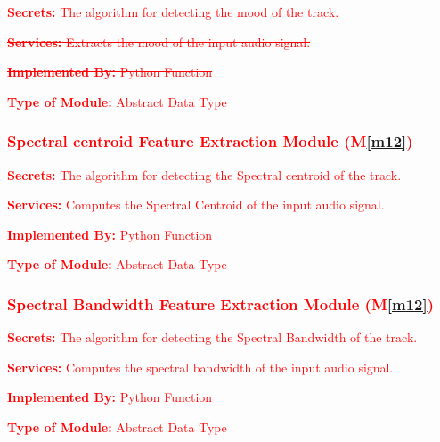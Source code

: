 \documentclass[12pt, titlepage]{article}
\newcommand{\mref}[1]{M\ref{#1}}
\begin{document}
\begin{description}
\item \textcolor{red}{\sout{\textbf{Secrets:} The algorithm for detecting the mood of the track.}}
\item \textcolor{red}{\sout{\textbf{Services:} Extracts the mood of the input audio signal.}}
\item \textcolor{red}{\sout{\textbf{Implemented By:} Python Function}}
\item \textcolor{red}{\sout{\textbf{Type of Module:} Abstract Data Type}}
\end{description}

\subsubsection{\textcolor{red}{Spectral centroid Feature Extraction Module (\mref{m12})}}

\begin{description}
\item \textcolor{red}{\textbf{Secrets:} The algorithm for detecting the Spectral centroid of the track.}
\item \textcolor{red}{\textbf{Services:} Computes the Spectral Centroid of the input audio signal.}
\item \textcolor{red}{\textbf{Implemented By:} Python Function}
\item \textcolor{red}{\textbf{Type of Module:} Abstract Data Type}
\end{description}

\subsubsection{\textcolor{red}{Spectral Bandwidth Feature Extraction Module (\mref{m12})}}

\begin{description}
\item \textcolor{red}{\textbf{Secrets:} The algorithm for detecting the Spectral Bandwidth of the track.}
\item \textcolor{red}{\textbf{Services:} Computes the spectral bandwidth of the input audio signal.}
\item \textcolor{red}{\textbf{Implemented By:} Python Function}
\item \textcolor{red}{\textbf{Type of Module:} Abstract Data Type}
\end{description}
\end{document}

